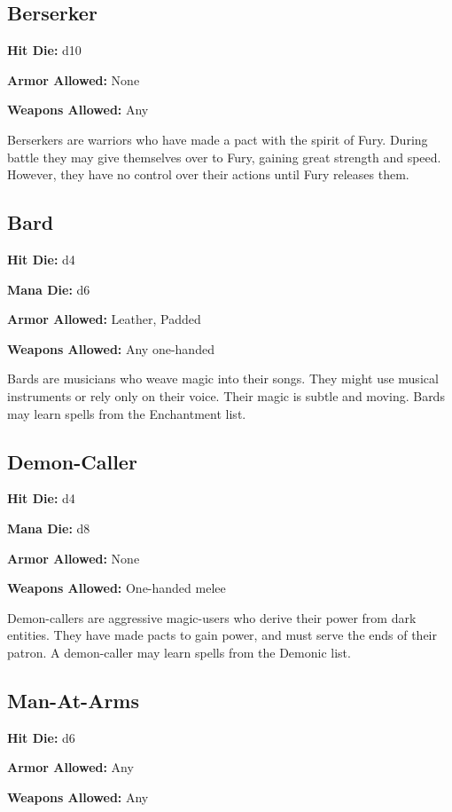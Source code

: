 \begin{multicols}{2}
\subsection{Berserker}

\textbf{Hit Die:} d10

\textbf{Armor Allowed:} None

\textbf{Weapons Allowed:} Any

Berserkers are warriors who have made a pact with the spirit of Fury. During
battle they may give themselves over to Fury, gaining great strength and speed.
However, they have no control over their actions until Fury releases them.

\subsection{Bard}

\textbf{Hit Die:} d4

\textbf{Mana Die:} d6

\textbf{Armor Allowed:} Leather, Padded

\textbf{Weapons Allowed:} Any one-handed

Bards are musicians who weave magic into their songs. They might use musical
instruments or rely only on their voice. Their magic is subtle and moving.
Bards may learn spells from the Enchantment list.

\subsection{Demon-Caller}

\textbf{Hit Die:} d4

\textbf{Mana Die:} d8

\textbf{Armor Allowed:} None

\textbf{Weapons Allowed:} One-handed melee

Demon-callers are aggressive magic-users who derive their power from dark entities.
They have made pacts to gain power, and must serve the ends of their patron.
A demon-caller may learn spells from the Demonic list.

\subsection{Man-At-Arms}

\textbf{Hit Die:} d6

\textbf{Armor Allowed:} Any

\textbf{Weapons Allowed:} Any


\end{multicols}
